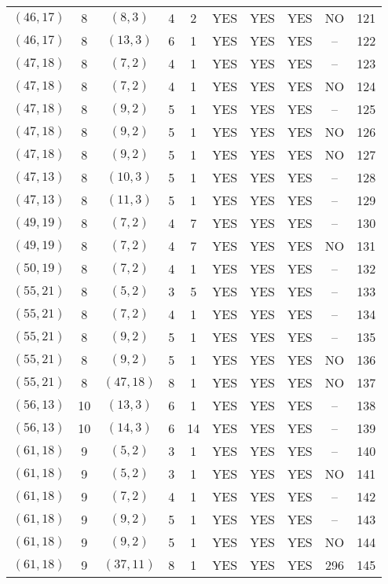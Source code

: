 \begin{longtable}{|c|c|c|c|c|c|c|c|c|c|}
$(46, 17)$ & 8 & $(8, 3)$ & 4 & 2 & YES & YES & YES & NO & 121\\
$(46, 17)$ & 8 & $(13, 3)$ & 6 & 1 & YES & YES & YES & -- & 122\\
$(47, 18)$ & 8 & $(7, 2)$ & 4 & 1 & YES & YES & YES & -- & 123\\
$(47, 18)$ & 8 & $(7, 2)$ & 4 & 1 & YES & YES & YES & NO & 124\\
$(47, 18)$ & 8 & $(9, 2)$ & 5 & 1 & YES & YES & YES & -- & 125\\
$(47, 18)$ & 8 & $(9, 2)$ & 5 & 1 & YES & YES & YES & NO & 126\\
$(47, 18)$ & 8 & $(9, 2)$ & 5 & 1 & YES & YES & YES & NO & 127\\
$(47, 13)$ & 8 & $(10, 3)$ & 5 & 1 & YES & YES & YES & -- & 128\\
$(47, 13)$ & 8 & $(11, 3)$ & 5 & 1 & YES & YES & YES & -- & 129\\
$(49, 19)$ & 8 & $(7, 2)$ & 4 & 7 & YES & YES & YES & -- & 130\\
$(49, 19)$ & 8 & $(7, 2)$ & 4 & 7 & YES & YES & YES & NO & 131\\
$(50, 19)$ & 8 & $(7, 2)$ & 4 & 1 & YES & YES & YES & -- & 132\\
$(55, 21)$ & 8 & $(5, 2)$ & 3 & 5 & YES & YES & YES & -- & 133\\
$(55, 21)$ & 8 & $(7, 2)$ & 4 & 1 & YES & YES & YES & -- & 134\\
$(55, 21)$ & 8 & $(9, 2)$ & 5 & 1 & YES & YES & YES & -- & 135\\
$(55, 21)$ & 8 & $(9, 2)$ & 5 & 1 & YES & YES & YES & NO & 136\\
$(55, 21)$ & 8 & $(47, 18)$ & 8 & 1 & YES & YES & YES & NO & 137\\
$(56, 13)$ & 10 & $(13, 3)$ & 6 & 1 & YES & YES & YES & -- & 138\\
$(56, 13)$ & 10 & $(14, 3)$ & 6 & 14 & YES & YES & YES & -- & 139\\
$(61, 18)$ & 9 & $(5, 2)$ & 3 & 1 & YES & YES & YES & -- & 140\\
$(61, 18)$ & 9 & $(5, 2)$ & 3 & 1 & YES & YES & YES & NO & 141\\
$(61, 18)$ & 9 & $(7, 2)$ & 4 & 1 & YES & YES & YES & -- & 142\\
$(61, 18)$ & 9 & $(9, 2)$ & 5 & 1 & YES & YES & YES & -- & 143\\
$(61, 18)$ & 9 & $(9, 2)$ & 5 & 1 & YES & YES & YES & NO & 144\\
$(61, 18)$ & 9 & $(37, 11)$ & 8 & 1 & YES & YES & YES & 296 & 145\\

\end{longtable}

